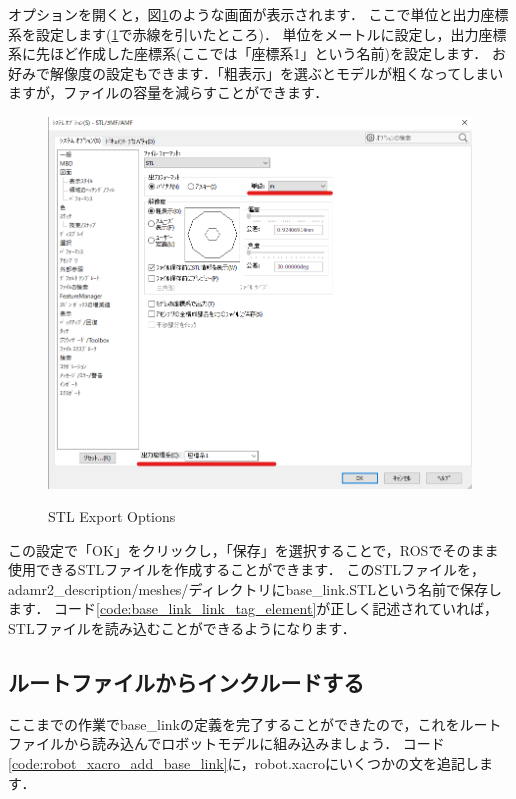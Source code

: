 \documentclass[{../../master}]{subfiles}
\begin{document}
\noindent
オプションを開くと，図\ref{fig:base_link_stl_export_options}のような画面が表示されます．
ここで単位と出力座標系を設定します(\ref{fig:base_link_stl_export_options}で赤線を引いたところ)．
単位をメートルに設定し，出力座標系に先ほど作成した座標系(ここでは「座標系1」という名前)を設定します．
お好みで解像度の設定もできます．「粗表示」を選ぶとモデルが粗くなってしまいますが，ファイルの容量を減らすことができます．

\begin{figure}[ht]
  \centering
  \includegraphics[width=100truemm, clip]{images/base_link_stl_export_options.png}
  \label{fig:base_link_stl_export_options}
  \caption{STL Export Options}
\end{figure}

この設定で「OK」をクリックし，「保存」を選択することで，ROSでそのまま使用できるSTLファイルを作成することができます．
このSTLファイルを，\textsf{adamr2\_description/meshes/}ディレクトリに\textsf{base\_link.STL}という名前で保存します．
コード\ref{code:base_link_link_tag_element}が正しく記述されていれば，STLファイルを読み込むことができるようになります．

\subsection{ルートファイルからインクルードする}
\label{sec:base_link_include}

ここまでの作業で\textsf{base\_link}の定義を完了することができたので，これをルートファイルから読み込んでロボットモデルに組み込みましょう．
コード\ref{code:robot_xacro_add_base_link}に，\textsf{robot.xacro}にいくつかの文を追記します．
\end{document}
